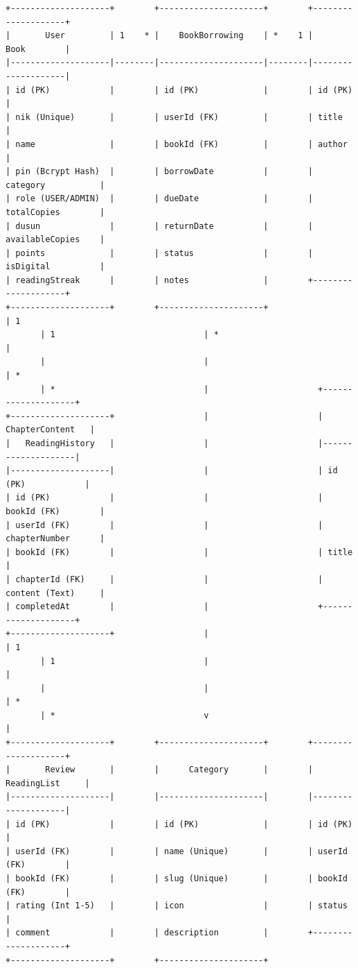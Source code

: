 \documentclass[
  indonesian,
  12pt,
]{report}
\begin{document}
\begin{verbatim}
+--------------------+        +---------------------+        +--------------------+
|       User         | 1    * |    BookBorrowing    | *    1 |        Book        |
|--------------------|--------|---------------------|--------|--------------------|
| id (PK)            |        | id (PK)             |        | id (PK)            |
| nik (Unique)       |        | userId (FK)         |        | title              |
| name               |        | bookId (FK)         |        | author             |
| pin (Bcrypt Hash)  |        | borrowDate          |        | category           |
| role (USER/ADMIN)  |        | dueDate             |        | totalCopies        |
| dusun              |        | returnDate          |        | availableCopies    |
| points             |        | status              |        | isDigital          |
| readingStreak      |        | notes               |        +--------------------+
+--------------------+        +---------------------+                  | 1
       | 1                              | *                            |
       |                                |                              | *
       | *                              |                      +--------------------+
+--------------------+                  |                      |   ChapterContent   |
|   ReadingHistory   |                  |                      |--------------------|
|--------------------|                  |                      | id (PK)            |
| id (PK)            |                  |                      | bookId (FK)        |
| userId (FK)        |                  |                      | chapterNumber      |
| bookId (FK)        |                  |                      | title              |
| chapterId (FK)     |                  |                      | content (Text)     |
| completedAt        |                  |                      +--------------------+
+--------------------+                  |                              | 1
       | 1                              |                              |
       |                                |                              | *
       | *                              v                              |
+--------------------+        +---------------------+        +--------------------+
|       Review       |        |      Category       |        |    ReadingList     |
|--------------------|        |---------------------|        |--------------------|
| id (PK)            |        | id (PK)             |        | id (PK)            |
| userId (FK)        |        | name (Unique)       |        | userId (FK)        |
| bookId (FK)        |        | slug (Unique)       |        | bookId (FK)        |
| rating (Int 1-5)   |        | icon                |        | status             |
| comment            |        | description         |        +--------------------+
+--------------------+        +---------------------+
\end{verbatim}
\end{document}
